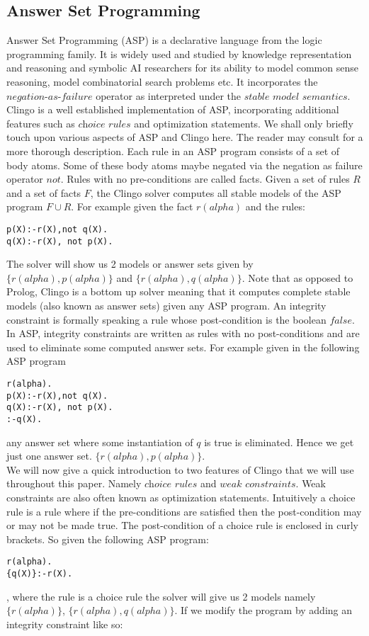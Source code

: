 \subsection{Answer Set Programming}
Answer Set Programming (ASP) is a declarative language from the logic programming family. It is widely used and studied by knowledge representation and reasoning and symbolic AI researchers for its ability to model common sense reasoning, model combinatorial search problems etc. It incorporates the $\textit{negation-as-failure}$ operator as interpreted under the $\textit{stable model semantics}$. Clingo is a well established implementation of ASP, incorporating additional features such as $\textit{choice rules}$ and optimization statements. We shall only briefly touch upon various aspects of ASP and Clingo here. The reader may consult \cite{gebser12:_answer_set_solvin_pract} for a more thorough description. Each rule in an ASP program consists of a set of body atoms. Some of these body atoms maybe negated via the negation as failure operator $not$. Rules with no pre-conditions are called facts. Given a set of rules $R$ and a set of facts $F$, the Clingo solver computes all stable models of the ASP program $F\cup R$. For example given the fact $r(alpha)$ and the rules:
\begin{lstlisting}[frame=none]
p(X):-r(X),not q(X).
q(X):-r(X), not p(X).
\end{lstlisting}
The solver will show us 2 models or answer sets given by\\ $\{r(alpha),p(alpha)\}$ and $\{r(alpha),q(alpha)\}$. Note that as opposed to Prolog, Clingo is a bottom up solver meaning that it computes complete stable models (also known as answer sets) given any ASP program. An integrity constraint is formally speaking a rule whose post-condition is the boolean $false$. In ASP, integrity constraints are written as rules with no post-conditions and are used to eliminate some computed answer sets. For example given in the following ASP program
\begin{lstlisting}[frame=none]
r(alpha).
p(X):-r(X),not q(X).
q(X):-r(X), not p(X).
:-q(X).
\end{lstlisting}
any answer set where some instantiation of $q$ is true is eliminated. Hence we get just one answer set. $\{r(alpha),p(alpha)\}$.\\ We will now give a quick introduction to two features of Clingo that we will use throughout this paper. Namely $\textit{choice rules}$ and $\textit{weak constraints}$. Weak constraints are also often known as optimization statements. Intuitively a choice rule is a rule where if the pre-conditions are satisfied then the post-condition may or may not be made true. The post-condition of a choice rule is enclosed in curly brackets. So given the following ASP program:\begin{lstlisting}[frame=none]
r(alpha).
{q(X)}:-r(X).
\end{lstlisting}, where the rule is a choice rule the solver will give us 2 models namely $\{r(alpha)\}$, $\{r(alpha),q(alpha)\}$. If we modify the program by adding an integrity constraint like so:
